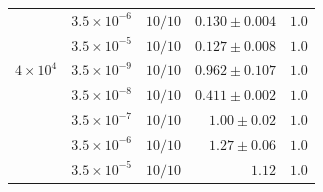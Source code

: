 \begin{table}[htbp]
{\begin{tabular}{llrrr}
 & $3.5 \times 10^{-6}$ & $10/10$ & $0.130 \pm 0.004$ & $1.0$ \\
 & $3.5 \times 10^{-5}$ & $10/10$ & $0.127 \pm 0.008$ & $1.0$ \\
\midrule
$4 \times 10^{4}$ & $3.5 \times 10^{-9}$ & $10/10$ & $0.962 \pm 0.107$ & $1.0$ \\
 & $3.5 \times 10^{-8}$ & $10/10$ & $0.411 \pm 0.002$ & $1.0$ \\
 & $3.5 \times 10^{-7}$ & $10/10$ & $1.00 \pm 0.02$ & $1.0$ \\
 & $3.5 \times 10^{-6}$ & $10/10$ & $1.27 \pm 0.06$ & $1.0$ \\
 & $3.5 \times 10^{-5}$ & $10/10$ & $1.12$ & $1.0$ \\
\bottomrule
\end{tabular}
}
\end{table}
